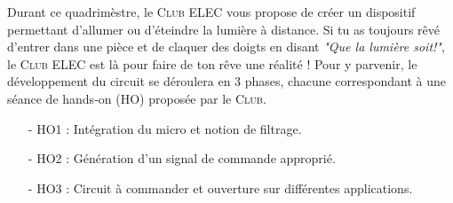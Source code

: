 
Durant ce quadrimèstre, le \textsc{Club ELEC} vous propose de créer un dispositif
permettant d'allumer ou d'éteindre la lumière à distance. Si tu as toujours rêvé d'entrer
dans une pièce et de claquer des doigts en disant \textit{"Que la lumière soit!"}, le \textsc{Club ELEC}
est là pour faire de ton rêve une réalité ! Pour y parvenir, le développement du circuit se déroulera
en 3 phases, chacune correspondant à une séance de hands-on (HO) proposée par le \textsc{Club}.

\begin{itemize}
    \item[-] HO1 : Intégration du micro et notion de filtrage.
    \item[-] HO2 : Génération d'un signal de commande approprié.
    \item[-] HO3 : Circuit à commander et ouverture sur différentes applications.
\end{itemize}

